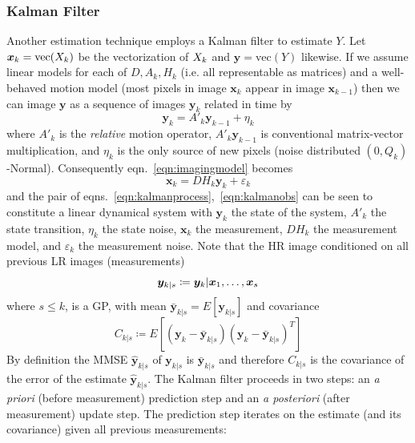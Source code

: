 \subsubsection{Kalman Filter}
Another estimation technique employs a Kalman filter\cite{elad1999} to estimate $Y$.
%
Let $\bm{x}_k = \text{vec}(X_k)$ be the vectorization of $X_k$ and $\bm{y} = \text{vec}(Y)$ likewise.
%
If we assume linear models for each of $D, A_k, H_k$ (i.e. all representable as matrices) and a well-behaved motion model (most pixels in image $\bm{x}_k$ appear in image $\bm{x}_{k-1}$) then we can image $\bm{y}$ as a sequence of images $\bm{y}_k$ related in time by
\begin{equation}
	\bm{y}_k = A'_k \bm{y}_{k-1} + \eta_k
	\label{eqn:kalmanprocess}
\end{equation}
%
where $A'_k$ is the \textit{relative} motion operator, $A'_k\bm{y}_{k-1}$ is conventional matrix-vector multiplication, and $\eta_k$ is the only source of new pixels (noise distributed $(0, Q_k)$-Normal).
%
Consequently eqn.~\eqref{eqn:imagingmodel} becomes
\begin{equation}
	\bm{x}_k = DH_k\bm{y}_k + \varepsilon_k
	\label{eqn:kalmanobs}
\end{equation}
and the pair of eqns.~\ref{eqn:kalmanprocess},~\ref{eqn:kalmanobs} can be seen to constitute a linear dynamical system with $\bm{y}_k$ the state of the system, $A'_k$ the state transition, $\eta_k$ the state noise, $\bm{x}_k$ the measurement, $DH_k$ the measurement model, and $\varepsilon_k$ the measurement noise.
%
Note that the HR image conditioned on all previous LR images (measurements)
\begin{equation}
	\bm{y}_{k|s} \coloneqq \bm{y}_k|\bm{x}_1, \mathellipsis, \bm{x}_s
\end{equation}
where $s \leq k$, is a GP, with mean $\bar{\bm{y}}_{k|s} = E\left[\bm{y}_{k|s}\right]$
and covariance
\begin{equation}
	C_{k|s} \coloneqq E\left[ (\bm{y}_k - \bar{\bm{y}}_{k|s})(\bm{y}_k - \bar{\bm{y}}_{k|s})^T  \right]
\end{equation}
%
By definition the MMSE $\hat{\bm{y}}_{k|s}$ of $\bm{y}_{k|s}$ is $\bar{\bm{y}}_{k|s}$ and therefore $C_{k|s}$ is the covariance of the error of the estimate $\hat{\bm{y}}_{k|s}$.
%
The Kalman filter proceeds in two steps: an \textit{a priori} (before measurement) prediction step and an \textit{a posteriori} (after measurement) update step.
%
The prediction step iterates on the estimate (and its covariance) given all previous measurements:

